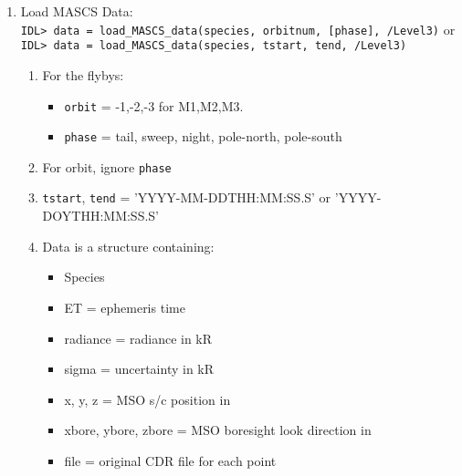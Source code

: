 \documentclass[11pt]{article}
\begin{document}
\begin{enumerate}
\item Load MASCS Data: \\
  \verb:IDL> data = load_MASCS_data(species, orbitnum, [phase], /Level3): or \\
  \verb:IDL> data = load_MASCS_data(species, tstart, tend, /Level3):
  \begin{enumerate}
  \item For the flybys:
     \begin{itemize}
     \item \texttt{orbit} = -1,-2,-3 for M1,M2,M3.
     \item \texttt{phase} = tail, sweep, night, pole-north, pole-south
     \end{itemize}
  \item For orbit, ignore \texttt{phase}
  \item \texttt{tstart}, \texttt{tend} = 'YYYY-MM-DDTHH:MM:SS.S' or
  'YYYY-DOYTHH:MM:SS.S'
  \item Data is a structure containing:
    \begin{itemize}
    \item Species
    \item ET = ephemeris time
    \item radiance = radiance in kR
    \item sigma = uncertainty in kR
    \item x, y, z = MSO s/c position in \Rmerc
    \item xbore, ybore, zbore = MSO boresight look direction in \Rmerc
    \item file = original CDR file for each point
    \end{itemize}
  \end{enumerate}

\end{enumerate}
\end{document}
